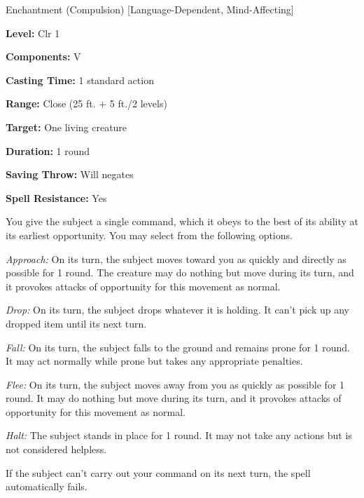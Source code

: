 
Enchantment (Compulsion) [Language-Dependent, Mind-Affecting]

\textbf{Level:} Clr 1

\textbf{Components:} V

\textbf{Casting Time:} 1 standard action

\textbf{Range:} Close (25 ft. + 5 ft./2 levels)

\textbf{Target:} One living creature

\textbf{Duration:} 1 round

\textbf{Saving Throw:} Will negates

\textbf{Spell Resistance:} Yes

You give the subject a single command, which it obeys to the best of its ability 
at its earliest opportunity. You may select from the following options.

\textit{Approach:} On its turn, the subject moves toward you as quickly and directly 
as possible for 1 round. The creature may do nothing but move during its turn, 
and it provokes attacks of opportunity for this movement as normal.

\textit{Drop:} On its turn, the subject drops whatever it is holding. It can't 
pick up any dropped item until its next turn.

\textit{Fall:} On its turn, the subject falls to the ground and remains prone for 
1 round. It may act normally while prone but takes any appropriate penalties.

\textit{Flee:} On its turn, the subject moves away from you as quickly as possible 
for 1 round. It may do nothing but move during its turn, and it provokes attacks 
of opportunity for this movement as normal.

\textit{Halt:} The subject stands in place for 1 round. It may not take any actions 
but is not considered helpless.

If the subject can't carry out your command on its next turn, the spell automatically 
fails.

